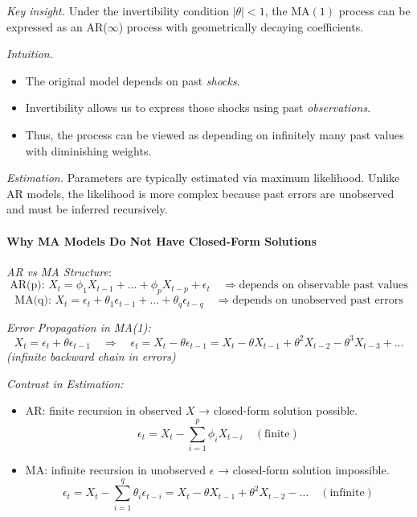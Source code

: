 \documentclass[10pt,a4paper]{article}
\begin{document}
	\textit{Key insight.} Under the invertibility condition $|\theta|<1$, the MA$(1)$ process can be expressed as an AR($\infty$) process with geometrically decaying coefficients.
	
	
	\textit{Intuition.}
	\begin{itemize}
	\item The original model depends on past \textit{shocks}.
	\item Invertibility allows us to express those shocks using past \textit{observations}.
	\item Thus, the process can be viewed as depending on infinitely many past values with diminishing weights.
	\end{itemize}
	
	\textit{Estimation.} Parameters are typically estimated via maximum likelihood. Unlike AR models, the likelihood is more complex because past errors are unobserved and must be inferred recursively.
	
	\paragraph{Why MA Models Do Not Have Closed-Form Solutions}
	
	\textit{AR vs MA Structure}:
	\[
	\text{AR(p): } X_t = \phi_1 X_{t-1} + \dots + \phi_p X_{t-p} + \epsilon_t
	\quad \Rightarrow \text{depends on observable past values}
	\]
	\[
	\text{MA(q): } X_t = \epsilon_t + \theta_1 \epsilon_{t-1} + \dots + \theta_q \epsilon_{t-q}
	\quad \Rightarrow \text{depends on unobserved past errors}
	\]
	
	\textit{Error Propagation in MA(1):}
	\[
	X_t = \epsilon_t + \theta \epsilon_{t-1} 
	\quad \Rightarrow \quad 
	\epsilon_t = X_t - \theta \epsilon_{t-1} 
	= X_t - \theta X_{t-1} + \theta^2 X_{t-2} - \theta^3 X_{t-3} + \dots
	\]
	\textit{(infinite backward chain in errors)}
	
	\textit{Contrast in Estimation:}
	\begin{itemize}
	    \item AR: finite recursion in observed $X$ → closed-form solution possible.
	    \[
	    \epsilon_t = X_t - \sum_{i=1}^{p} \phi_i X_{t-i} \quad (\text{finite})
	    \]
	    \item MA: infinite recursion in unobserved $\epsilon$ → closed-form solution impossible.
	    \[
	    \epsilon_t = X_t - \sum_{i=1}^{q} \theta_i \epsilon_{t-i} = X_t - \theta X_{t-1} + \theta^2 X_{t-2} - \dots \quad (\text{infinite})
	    \]
	\end{itemize}
	
\end{document}
